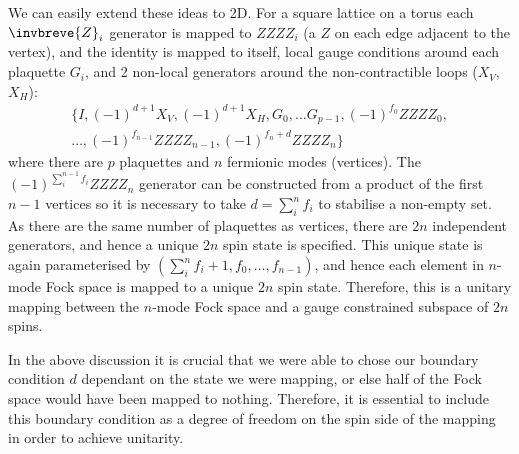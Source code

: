 \documentclass[aps,prx,twocolumn,floatfix,10pt,amssymb,amsfont,amsmath,superscriptaddress,float,nofootinbib,longbibliography,nobalancelastpage]{revtex4-2}
\begin{document}
We can easily extend these ideas to 2D. For a square lattice on a torus each $\invbreve{Z}_i$ generator is mapped to $ZZZZ_i$ (a $Z$ on each edge adjacent to the vertex), and the identity is mapped to itself, local gauge conditions around each plaquette $G_i$, and 2 non-local generators around the non-contractible loops ($X_V$, $X_H$):
\begin{multline}
    \{I, (-1)^{d+1}X_V, (-1)^{d+1}X_H,G_0,\ldots G_{p-1}, (-1)^{f_0} ZZZZ_0,\\ \ldots, (-1)^{f_{n-1}} ZZZZ_{n-1}, (-1)^{f_n+d} ZZZZ_{n}\}
    \label{eq:stabiliser_1d_pepo_spin_d}
\end{multline}
where there are $p$ plaquettes and $n$ fermionic modes (vertices). The $(-1)^{\sum_{i}^{n-1}f_i}ZZZZ_n$ generator can be constructed from a product of the first $n-1$ vertices so it is necessary to take $d = \sum_{i}^{n}f_i$ to stabilise a non-empty set. As there are the same number of plaquettes as vertices, there are $2n$ independent generators, and hence a unique $2n$ spin state is specified. This unique state is again parameterised by $(\sum_{i}^{n}f_i+1, f_0,\ldots, f_{n-1})$, and hence each element in $n$-mode Fock space is mapped to a unique $2n$ spin state. Therefore, this is a unitary mapping between the $n$-mode Fock space and a gauge constrained subspace of $2n$ spins.

In the above discussion it is crucial that we were able to chose our boundary condition $d$ dependant on the state we were mapping, or else half of the Fock space would have been mapped to nothing. Therefore, it is essential to include this boundary condition as a degree of freedom on the spin side of the mapping in order to achieve unitarity. 
\end{document}
